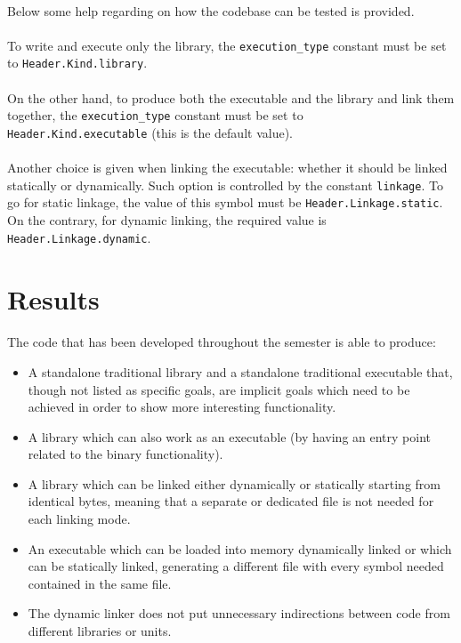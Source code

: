 \documentclass[12pt]{article}
\begin{document}
	\paragraph{}Below some help regarding on how the codebase can be tested is provided.
	\paragraph{}To write and execute only the library, the \verb|execution_type| constant must be set to \verb|Header.Kind.library|.
	\paragraph{}On the other hand, to produce both the executable and the library and link them together, the \verb|execution_type| constant must be set to\\ \verb|Header.Kind.executable| (this is the default value).
	\paragraph{}Another choice is given when linking the executable: whether it should be linked statically or dynamically. Such option is controlled by the constant \verb|linkage|. To go for static linkage, the value of this symbol must be \verb|Header.Linkage.static|. On the contrary, for dynamic linking, the required value is \verb|Header.Linkage.dynamic|.
	\newpage
	
	\section{Results}
	\paragraph{}The code that has been developed throughout the semester is able to produce:
	\begin{itemize}
		\item A standalone traditional library and a standalone traditional executable that, though not listed as specific goals, are implicit goals which need to be achieved in order to show more interesting functionality.
		\item A library which can also work as an executable (by having an entry point related to the binary functionality).
		\item A library which can be linked either dynamically or statically starting from identical bytes, meaning that a separate or dedicated file is not needed for each linking mode.
		\item An executable which can be loaded into memory dynamically linked or which can be statically linked, generating a different file with every symbol needed contained in the same file.
		\item The dynamic linker does not put unnecessary indirections between code from different libraries or units.
	\end{itemize}
	
\end{document}
